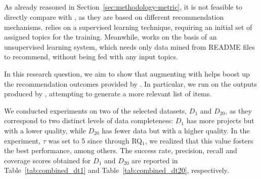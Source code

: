 \subsection{\rqsecond} \label{sec:EXP3}

As already reasoned in Section~\ref{sec:methodology-metric}, it is not feasible to directly compare \TF with \MNB, as they are based on different recommendation mechanisms. \TF relies on a supervised learning technique, requiring an initial set of assigned topics for the training. Meanwhile, \MNB works on the basis of an unsupervised learning system, which needs only data mined from README files to recommend, without being fed with any input topics.

In this research question, we aim to show that augmenting \MNB with \TF helps boost up the recommendation outcomes provided by \MNB. In particular, we run \TF on the outputs produced by \MNB, attempting to generate a more relevant list of items. %


We conducted experiments on two of the selected datasets, \ie $D_{1}$ and $D_{20}$, as they correspond to two distinct levels of data completeness: $D_{1}$ has more projects but with a lower quality, while $D_{20}$ has fewer data but with a higher quality. In the experiment, $\tau$ was set to 5 since through RQ$_1$, we realized that this value fosters the best performance, among others. %
The success rate, precision, recall and coverage scores obtained for $D_{1}$ and $D_{20}$ are reported in Table~\ref{tab:combined_dt1} and Table~\ref{tab:combined_dt20}, respectively. 

